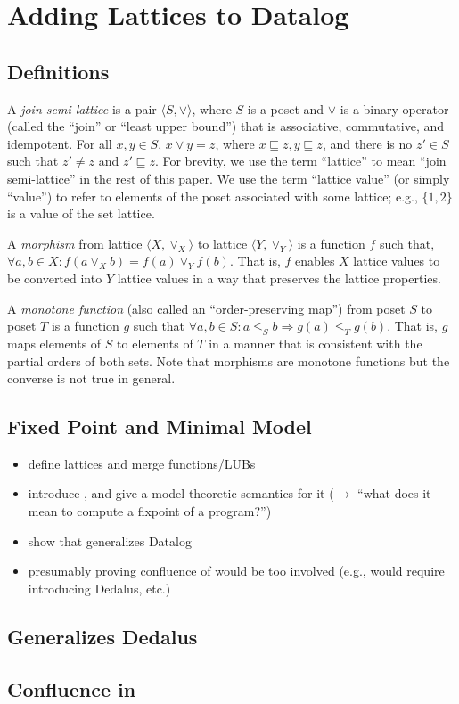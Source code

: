\section{Adding Lattices to Datalog}
\label{sec:foundation}

\subsection{Definitions}

A \emph{join semi-lattice} is a pair $\langle S, \lor \rangle$, where $S$ is a
poset and $\lor$ is a binary operator (called the ``join'' or ``least upper
bound'') that is associative, commutative, and idempotent. For all $x, y \in S$,
$x \lor y = z$, where $x \sqsubseteq z, y \sqsubseteq z$, and there is no $z'
\in S$ such that $z' \neq z$ and $z' \sqsubseteq z$. For brevity, we use the
term ``lattice'' to mean ``join semi-lattice'' in the rest of this paper. We use
the term ``lattice value'' (or simply ``value'') to refer to elements of the
poset associated with some lattice; e.g., $\{ 1,2 \}$ is a value of the set
lattice.

A \emph{morphism} from lattice $\langle X, \lor_X\rangle$ to lattice $\langle Y,
\lor_Y\rangle$ is a function $f$ such that, $\forall a,b \in X: f(a \lor_X b)
= f(a) \lor_Y f(b)$. That is, $f$ enables $X$ lattice values to be converted
into $Y$ lattice values in a way that preserves the lattice properties.

A \emph{monotone function} (also called an ``order-preserving map'') from poset
$S$ to poset $T$ is a function $g$ such that $\forall a,b \in S: a \leqslant_S b
\Rightarrow g(a) \leqslant_T g(b)$. That is, $g$ maps elements of $S$ to elements
of $T$ in a manner that is consistent with the partial orders of both sets. Note
that morphisms are monotone functions but the converse is not true in general.

\subsection{Fixed Point and Minimal Model}

\begin{itemize}
\item define lattices and merge functions/LUBs
\item introduce \baselang, and give a model-theoretic semantics for it ($\to$
  ``what does it mean to compute a fixpoint of a \baselang program?'')
\item show that \baselang generalizes Datalog
\item presumably proving confluence of \baselang would be too involved (e.g.,
  would require introducing Dedalus, etc.)
\end{itemize}

\subsection{\baselang Generalizes Dedalus}

\subsection{Confluence in \baselang}
